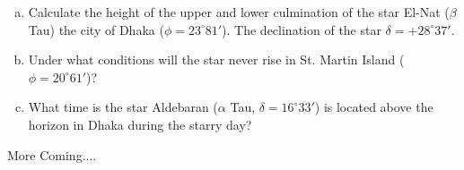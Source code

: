 \documentclass[a4paper,12pt]{extarticle}
\begin{document}
\begin{pro}
	\begin{enumerate}[a.]
		\itemsep0em
		\item Calculate the height of the upper and lower culmination of the star El-Nat ($\beta$ Tau) the city of Dhaka ($\phi =23^\circ 81'$). The declination of the star $\delta =+ 28^\circ 37'$.  
		\item Under what conditions will the star never rise in St. Martin Island ($\phi =20^\circ 61'$)? 
		\item What time is the star Aldebaran ($\alpha$ Tau, $\delta=16^\circ33'$) is located above the horizon in Dhaka during the starry day?
	\end{enumerate}
\end{pro}

More Coming....









\clearpage
\end{document}
